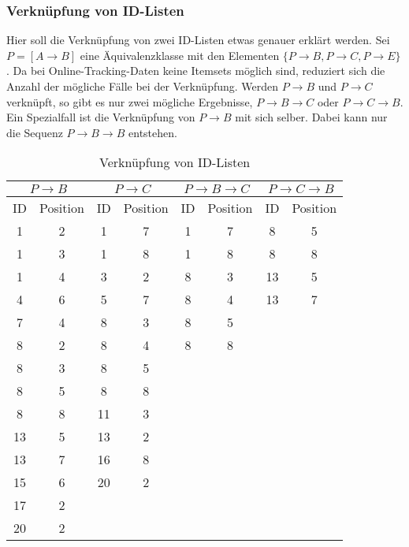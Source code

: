 \subsubsection*{Verknüpfung von ID-Listen}
Hier soll die Verknüpfung von zwei ID-Listen etwas genauer erklärt werden. Sei $P = [A\rightarrow B]$ eine Äquivalenzklasse mit den Elementen $\{P\rightarrow B,P\rightarrow C,P\rightarrow E \}$. Da bei Online-Tracking-Daten keine Itemsets möglich sind, reduziert sich die Anzahl der mögliche Fälle bei der Verknüpfung. Werden $P\rightarrow B$ und $P\rightarrow C$ verknüpft, so gibt es nur zwei mögliche Ergebnisse, $P\rightarrow B\rightarrow C$ oder $P\rightarrow C\rightarrow B$. Ein Spezialfall ist die Verknüpfung von $P\rightarrow B$ mit sich selber. Dabei kann nur die Sequenz $P\rightarrow B\rightarrow B$ entstehen.\\
\begin{table}[H]
\centering
\begin{tabular}{c|c||c|c||c|c||c|c}
\multicolumn{2}{c||}{$P\rightarrow B$} & \multicolumn{2}{c||}{$P\rightarrow C$} & \multicolumn{2}{c||}{$P\rightarrow B\rightarrow C$} & \multicolumn{2}{c}{$P\rightarrow C\rightarrow B$}\\ \hline \hline
ID  & Position & ID  & Position & ID & Position & ID & Position \\ \hline
1   & 2				 & 1   & 7			  & 1  & 7        & 8	 & 5   		  \\
1   & 3				 & 1   & 8        & 1  & 8        & 8  & 8        \\
1   & 4				 & 3   & 2        & 8  & 3        & 13 & 5        \\
4   & 6				 & 5   & 7        & 8  & 4        & 13 & 7        \\
7   & 4				 & 8   & 3        & 8  & 5        &    &          \\
8   & 2				 & 8   & 4        & 8  & 8        &    &          \\
8   & 3				 & 8   & 5        &    &          &    &          \\
8   & 5				 & 8   & 8        &    &          &    &          \\
8   & 8				 & 11  & 3        &    &          &    &          \\
13  & 5				 & 13  & 2        &    &          &    &          \\
13  & 7				 & 16  & 8        &    &          &    &          \\
15  & 6				 & 20  & 2        &    &          &    &          \\
17  & 2				 &     &          &    &          &    &          \\
20  & 2				 & 	   & 				  &    & 	        & 	 &     	
\end{tabular}
\caption{Verknüpfung von ID-Listen}\label{join}
\end{table}
